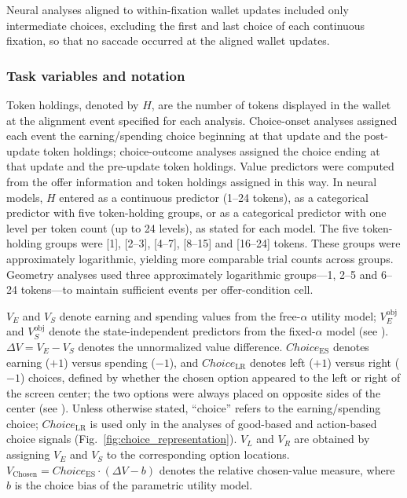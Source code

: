 \documentclass[pdflatex,sn-mathphys-num]{sn-jnl}%
\begin{document}
Neural analyses aligned to within-fixation wallet updates included only intermediate choices, excluding the first and last choice of each continuous fixation, so that no saccade occurred at the aligned wallet updates.

\subsubsection{Task variables and notation}\label{sec:m_variables}
Token holdings, denoted by $H$, are the number of tokens displayed in the wallet at the alignment event specified for each analysis. Choice-onset analyses assigned each event the earning/spending choice beginning at that update and the post-update token holdings; choice-outcome analyses assigned the choice ending at that update and the pre-update token holdings. Value predictors were computed from the offer information and token holdings assigned in this way. In neural models, $H$ entered as a continuous predictor (1--24 tokens), as a categorical predictor with five token-holding groups, or as a categorical predictor with one level per token count (up to 24 levels), as stated for each model. The five token-holding groups were [1], [2--3], [4--7], [8--15] and [16--24] tokens. These groups were approximately logarithmic, yielding more comparable trial counts across groups. Geometry analyses used three approximately logarithmic groups---1, 2--5 and 6--24 tokens---to maintain sufficient events per offer-condition cell.

$V_E$ and $V_S$ denote earning and spending values from the free-$\alpha$ utility model; $V_E^{\mathrm{obj}}$ and $V_S^{\mathrm{obj}}$ denote the state-independent predictors from the fixed-$\alpha$ model (see ). $\Delta V=V_E-V_S$ denotes the unnormalized value difference. $\mathit{Choice}_{\mathrm{ES}}$ denotes earning ($+1$) versus spending ($-1$), and $\mathit{Choice}_{\mathrm{LR}}$ denotes left ($+1$) versus right ($-1$) choices, defined by whether the chosen option appeared to the left or right of the screen center; the two options were always placed on opposite sides of the center (see ). Unless otherwise stated, ``choice'' refers to the earning/spending choice; $\mathit{Choice}_{\mathrm{LR}}$ is used only in the analyses of good-based and action-based choice signals (Fig.~\ref{fig:choice_representation}). $V_L$ and $V_R$ are obtained by assigning $V_E$ and $V_S$ to the corresponding option locations. $V_{\mathrm{Chosen}}=\mathit{Choice}_{\mathrm{ES}}\cdot(\Delta V-b)$ denotes the relative chosen-value measure, where $b$ is the choice bias of the parametric utility model.
\end{document}
